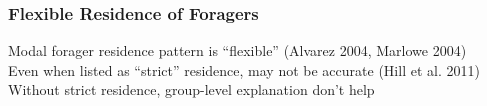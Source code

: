 \documentclass{beamer}
\begin{document}

\begin{frame}
\frametitle{Flexible Residence of Foragers}

Modal forager residence pattern is ``flexible'' (Alvarez 2004, Marlowe 2004) \\
\vspace{0.75cm}
Even when listed as ``strict'' residence, may not be accurate (Hill et al. 2011) \\
\vspace{0.75cm}
Without strict residence, group-level explanation don't help

\end{frame}



\end{document}
